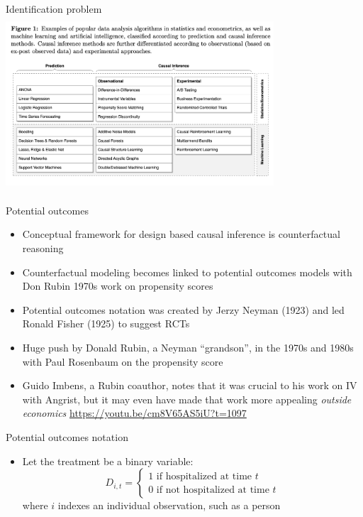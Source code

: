 \documentclass{beamer}
\begin{document}
\begin{frame}{Identification problem}
  \centering
  \includegraphics[scale=0.5,height=6.5cm, width=10cm]{./lecture_includes/prediction_causality.png}
\end{frame}



\begin{frame}{Potential outcomes}

\begin{itemize}
\item Conceptual framework for design based causal inference is counterfactual reasoning
\item Counterfactual modeling becomes linked to potential outcomes models with Don Rubin 1970s work on propensity scores
\item Potential outcomes notation was created by Jerzy Neyman (1923) and led Ronald Fisher (1925) to suggest RCTs
\item Huge push by Donald Rubin, a Neyman ``grandson'', in the 1970s and 1980s with Paul Rosenbaum on the propensity score
\item Guido Imbens, a Rubin coauthor, notes that it was crucial to his work on IV with Angrist, but it may even have made that work more appealing \emph{outside economics}
\url{https://youtu.be/cm8V65AS5iU?t=1097}

\end{itemize}

\end{frame}




\begin{frame}{Potential outcomes notation}

  \begin{itemize}
    \item Let the treatment be a binary variable: $$D_{i,t} =\begin{cases} 1 \text{ if hospitalized at time $t$} \\ 0 \text{ if not hospitalized at time $t$} \end{cases}$$where $i$ indexes an individual observation, such as a person
  \end{itemize}
\end{frame}
\end{document}
